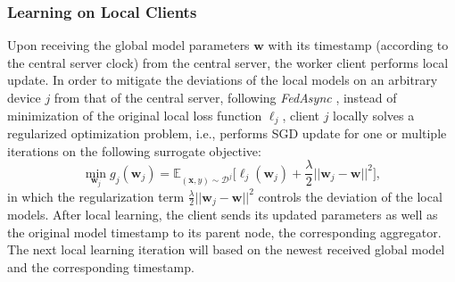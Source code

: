 \documentclass[10pt,twocolumn,letterpaper]{article}
\theoremstyle{definition}
\begin{document}
\subsubsection{Learning on Local Clients}
Upon receiving the global model parameters $\mathbf{w}$ with its timestamp (according to the central server clock) from the central server, the worker client performs local update.
In order to mitigate the deviations of the local models on an arbitrary device $j$ from that of the central server, following \textit{FedAsync} \cite{xie2019asynchronous}, instead of minimization of the original local loss function $\ell_j$, client $j$ locally solves a regularized optimization problem, i.e., performs SGD update for one or multiple iterations on the following surrogate objective:
\[ \min\limits_{\mathbf{w}_j} g_j(\mathbf{w}_j) =  \mathbb{E}_{(\mathbf{x}, y) \sim \mathcal{D}^j} \Big[\ell_j(\mathbf{w}_j) + \frac{\lambda}{2} || \mathbf{w}_j - \mathbf{w} ||^2 \Big], \]
in which the regularization term $\frac{\lambda}{2} || \mathbf{w}_j - \mathbf{w} ||^2$ controls the deviation of the local models. After local learning, the client sends its updated parameters as well as the original model timestamp to its parent node, the corresponding aggregator. The next local learning iteration will based on the newest received global model and the corresponding timestamp.
\end{document}
